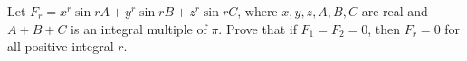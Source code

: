 Let $F_r=x^r\sin{rA}+y^r\sin{rB}+z^r\sin{rC}$, where $x,y,z,A,B,C$ are real and $A+B+C$ is an integral multiple of $\pi$. Prove that if $F_1=F_2=0$, then $F_r=0$ for all positive integral $r$.
